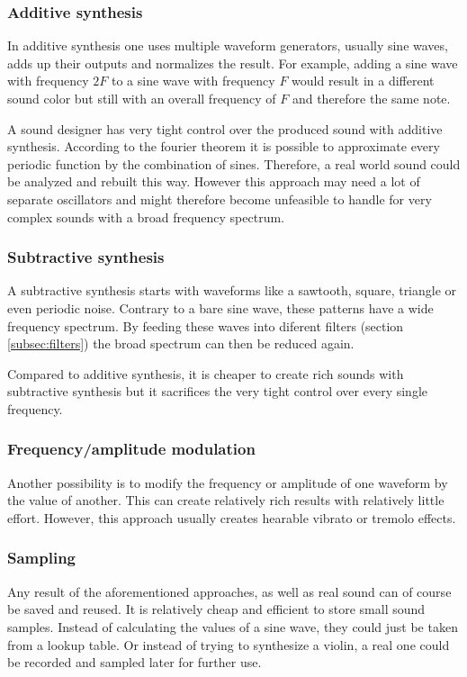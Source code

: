 			\subsubsection{Additive synthesis}
				In additive synthesis one uses multiple waveform generators, usually sine waves, adds up their outputs and normalizes the result.
				For example, adding a sine wave with frequency $2F$ to a sine wave with frequency $F$ would result in a different sound color but still with an overall frequency of $F$ and therefore the same note.
				
				A sound designer has very tight control over the produced sound with additive synthesis.
				According to the fourier theorem it is possible to approximate every periodic function by the combination of sines. 
				Therefore, a real world sound could be analyzed and rebuilt this way.
				However this approach may need a lot of separate oscillators and might therefore become unfeasible to handle for very complex sounds with a broad frequency spectrum.
			\subsubsection{Subtractive synthesis}
				A subtractive synthesis starts with waveforms like a sawtooth, square, triangle or even periodic noise.
				Contrary to a bare sine wave, these patterns have a wide frequency spectrum. 
				By feeding these waves into diferent filters (section \ref{subsec:filters}) the broad spectrum can then be reduced again. 
				
				Compared to additive synthesis, it is cheaper to create rich sounds with subtractive synthesis but it sacrifices the very tight control over every single frequency.
			\subsubsection{Frequency/amplitude modulation}
				Another possibility is to modify the frequency or amplitude of one waveform by the value of another.
				This can create relatively rich results with relatively little effort.
				However, this approach usually creates hearable vibrato or tremolo effects.
			\subsubsection{Sampling}
				Any result of the aforementioned approaches, as well as real sound can of course be saved and reused.
				It is relatively cheap and efficient to store small sound samples. 
				Instead of calculating the values of a sine wave, they could just be taken from a lookup table.
				Or instead of trying to synthesize a violin, a real one could be recorded and sampled later for further use.
				
